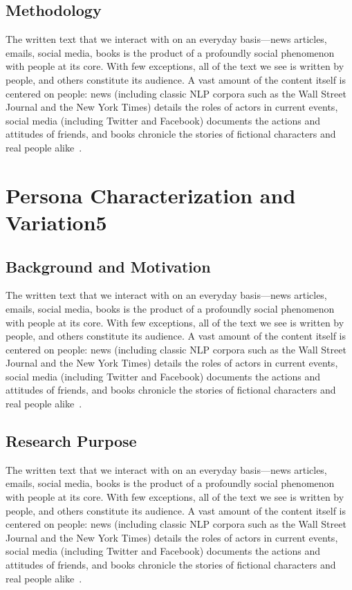 \documentclass[11pt]{article}
\renewcommand\cite{\citep}  %
\begin{document}
\subsection{Methodology}
The written text that we interact with on an everyday basis—news articles, emails, social media, books is the product of a profoundly social phenomenon with people at its core. With few exceptions, all of the text we see is written by people, and others constitute its audience. A vast amount of the content itself is centered on people: news (including classic NLP corpora such as the Wall Street Journal and the New York Times) details the roles of actors in current events, social media (including Twitter and Facebook) documents
the actions and attitudes of friends, and books chronicle the stories of fictional characters and real people alike~\cite{serban2016building}.
\section{Persona Characterization and Variation5}
\subsection{Background and Motivation}
The written text that we interact with on an everyday basis—news articles, emails, social media, books is the product of a profoundly social phenomenon with people at its core. With few exceptions, all of the text we see is written by people, and others constitute its audience. A vast amount of the content itself is centered on people: news (including classic NLP corpora such as the Wall Street Journal and the New York Times) details the roles of actors in current events, social media (including Twitter and Facebook) documents
the actions and attitudes of friends, and books chronicle the stories of fictional characters and real people alike~\cite{serban2016building}.
\subsection{Research Purpose}
The written text that we interact with on an everyday basis—news articles, emails, social media, books is the product of a profoundly social phenomenon with people at its core. With few exceptions, all of the text we see is written by people, and others constitute its audience. A vast amount of the content itself is centered on people: news (including classic NLP corpora such as the Wall Street Journal and the New York Times) details the roles of actors in current events, social media (including Twitter and Facebook) documents
the actions and attitudes of friends, and books chronicle the stories of fictional characters and real people alike~\cite{serban2016building}.
\end{document}
